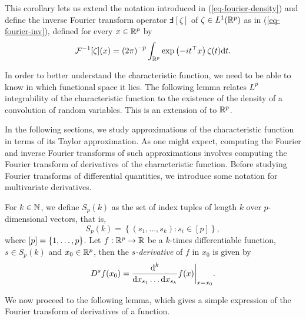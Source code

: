 This corollary lets us extend the notation introduced in (\ref{eq-fourier-density}) and define the inverse Fourier transform operator $\Finv[\zeta]$ of $\zeta \in L^1({\mathbb{R}^p})$ as in (\ref{eq-fourier-inv}), defined for every $x \in {\mathbb{R}^p}$ by
\begin{equation*}
    {\mathcal{F}^{-1}}[\zeta](x) = \left(2\pi\right)^{-p}\int_{\mathbb{R}^p} \exp\left(-i t^\top x\right) \zeta(t) \text{d} t.
\end{equation*}

In order to better understand the characteristic function, we need to be able to know in which functional space it lies. The following lemma relates $L^p$ integrability of the characteristic function to the existence of the density of a convolution of random variables. This is an extension of \cite[Lemma 2.4.4]{kolassa2006series} to ${\mathbb{R}^p}$.



In the following sections, we study approximations of the characteristic function in terms of its Taylor approximation. As one might expect, computing the Fourier and inverse Fourier transforms of such approximations involves computing the Fourier transform of derivatives of the characteristic function. Before studying Fourier transforms of differential quantities, we introduce some notation for multivariate derivatives.

For $k \in \mathbb{N}$, we define $S_p(k)$ as the set of index tuples of length $k$ over $p$-dimensional vectors, that is,
\begin{equation*}
    S_p(k) = \left\{ (s_1, \ldots, s_k) : s_i \in [p] \right\},
\end{equation*}
where $[p] = {\left\{1, \ldots, p\right\}}$. Let $f : {\mathbb{R}^p} \rightarrow \mathbb{R}$ be a $k$-times differentiable function, $s \in S_p(k)$ and $x_0 \in {\mathbb{R}^p}$, then the \textit{$s$-derivative} of $f$ in $x_0$ is given by
\begin{equation*}
    D^s f(x_0) = \frac{\text{d}^k}{\text{d} x_{s_1} \ldots \text{d} x_{s_k}} f(x) \bigg|_{x=x_0}.
\end{equation*}

We now proceed to the following lemma, which gives a simple expression of the Fourier transform of derivatives of a function.

